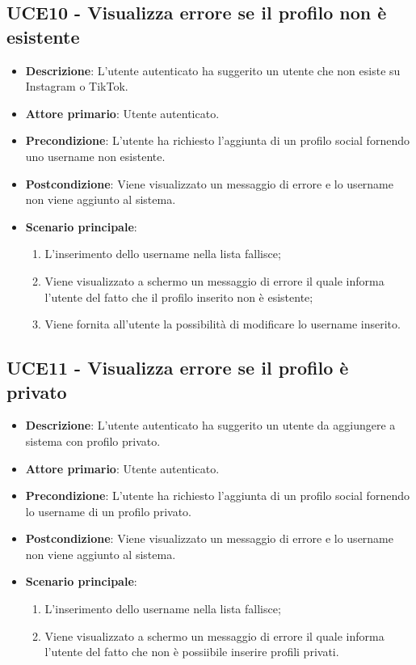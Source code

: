 \subsection{UCE10 - Visualizza errore se il profilo non è esistente}
\begin{itemize}
	\item \textbf{Descrizione}: L'utente autenticato ha suggerito un utente che non esiste su Instagram o TikTok.
    \item \textbf{Attore primario}: Utente autenticato.
    \item \textbf{Precondizione}: L’utente ha richiesto l’aggiunta di un profilo social fornendo uno username non esistente.
    \item \textbf{Postcondizione}: Viene visualizzato un messaggio di errore e lo username non viene aggiunto al sistema.
    \item \textbf{Scenario principale}: 
    \begin{enumerate}
        \item L'inserimento dello username nella lista fallisce;
        \item Viene visualizzato a schermo un messaggio di errore il quale informa l'utente del fatto che il profilo inserito non è esistente;
        \item Viene fornita all'utente la possibilità di modificare lo username inserito.
    \end{enumerate}
\end{itemize}

\subsection{UCE11 - Visualizza errore se il profilo è privato}
\begin{itemize}
	\item \textbf{Descrizione}: L'utente autenticato ha suggerito un utente da aggiungere a sistema con profilo privato.
    \item \textbf{Attore primario}: Utente autenticato.
    \item \textbf{Precondizione}: L’utente ha richiesto l’aggiunta di un profilo social fornendo lo username di un profilo privato.
    \item \textbf{Postcondizione}: Viene visualizzato un messaggio di errore e lo username non viene aggiunto al sistema.
    \item \textbf{Scenario principale}: 
    \begin{enumerate}
        \item L'inserimento dello username nella lista fallisce;
        \item Viene visualizzato a schermo un messaggio di errore il quale informa l'utente del fatto che non è possiibile inserire profili privati.
    \end{enumerate}
\end{itemize}

